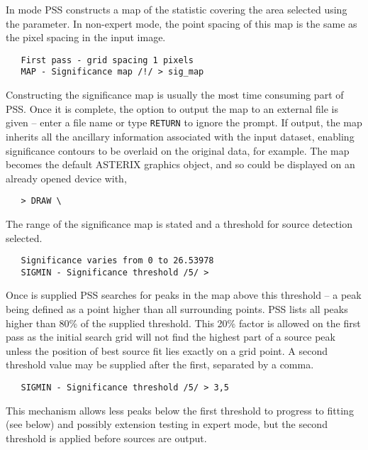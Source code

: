 In  mode PSS constructs a map of the statistic covering the area
selected using the  parameter. In non-expert mode, the point 
spacing of this map is the same as the pixel spacing in the input image.
\begin{verbatim}
   First pass - grid spacing 1 pixels
   MAP - Significance map /!/ > sig_map
\end{verbatim}
Constructing the significance map is usually the most time consuming part
of PSS. Once it is complete, the option to output the map to an external
file is given -- enter a file name or type {\tt RETURN} to ignore the prompt.
If output, the map inherits all the ancillary information associated with
the input dataset, enabling significance contours to be overlaid on the
original data, for example. The map becomes the default ASTERIX graphics
object, and so could be displayed on an already opened device with,
\begin{verbatim}
   > DRAW \
\end{verbatim}

The range of the significance map is stated and a threshold for source 
detection selected. 
\begin{verbatim}
   Significance varies from 0 to 26.53978
   SIGMIN - Significance threshold /5/ > 
\end{verbatim}
Once  is supplied PSS searches for peaks in the map above this
threshold -- a peak being defined as a point higher than all surrounding points.
PSS lists all peaks higher than 80\% of the supplied threshold. This 20\%
factor is allowed on the first pass as the initial search grid will not 
find the highest part of a source peak unless the position of best source 
fit lies exactly on a grid point. A second threshold value may be supplied
after the first, separated by a comma. 
\begin{verbatim}
   SIGMIN - Significance threshold /5/ > 3,5
\end{verbatim}
This mechanism allows less peaks below the first threshold to progress to 
fitting (see below) and possibly extension testing in expert mode, but 
the second threshold is applied before sources are output.

